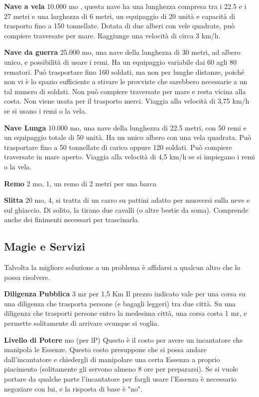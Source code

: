 \documentclass[a4paper,11pt,twoside,openany]{book}
\begin{document}
{\textbf{Nave a vela} 10.000 mo , questa nave ha una lunghezza compresa tra i 22.5 e i 27 metri e una larghezza di 6 metri, un equipaggio di 20 unità e capacità di trasporto fino a 150 tonnellate. Dotata di due alberi con vele quadrate, può compiere traversate per mare. Raggiunge una velocità di circa 3 km/h. 

\textbf{Nave da guerra} 25.000 mo, una nave della lunghezza di 30 metri, ad albero unico, e possibilità di usare i remi. Ha un equipaggio variabile dai 60 agli 80 rematori. Può trasportare fino 160 soldati, ma non per lunghe distanze, poiché non vi è lo spazio sufficiente a stivare le provviste che sarebbero necessarie a un tal numero di soldati. Non può compiere traversate per mare e resta vicina alla costa. Non viene usata per il trasporto merci. Viaggia alla velocità di 3,75 km/h se si usano i remi o la vela.

\textbf{Nave Lunga} 10.000 mo, una nave della lunghezza di 22.5 metri, con 50 remi e un equipaggio totale di 50 unità. Ha un unico albero con una vela quadrata. Può trasportare fino a 50 tonnellate di carico oppure 120 soldati. Può compiere traversate in mare aperto. Viaggia alla velocità di 4,5 km/h se si impiegano i remi o la vela.

\textbf{Remo} 2 mo, 1, un remo di 2 metri per una barca

\textbf{Slitta} 20 mo, 4, si tratta di un carro su pattini adatto per muoversi sulla neve e sul ghiaccio. Di solito, la tirano due cavalli (o altre bestie da soma). Comprende anche dei finimenti necessari per trascinarla.

\pagebreak

\subsection{Magie e Servizi}

\label{magie-e-servizi}

Talvolta la migliore soluzione a un problema è affidarsi a qualcun altro che lo possa risolvere.

\textbf{Diligenza Pubblica} 3 mr per 1,5 Km Il prezzo indicato vale per una corsa su una diligenza che trasporta persone (e bagagli leggeri) tra due città. Su una diligenza che trasporti persone entro la medesima città, una corsa costa 1 mr, e permette solitamente di arrivare ovunque si voglia.

\textbf{Livello di Potere}  mo (per lP) Questo è il costo per avere un incantatore che manipola le Essenze. Questo costo presuppone che si possa andare dall'incantatore e chiedergli di manipolare una certa Essenza a proprio piacimento (solitamente gli servono almeno 8 ore per prepararsi). Se si vuole portare da qualche parte l'incantatore per fargli usare l'Essenza è necessario negoziare con lui, e la risposta di base è "no".

}
\end{document}
